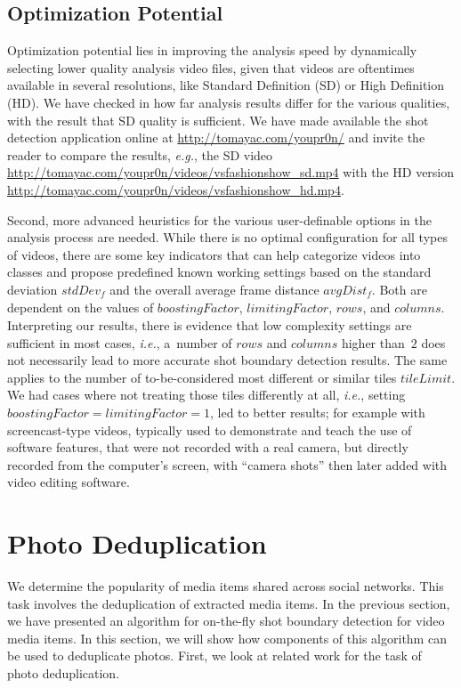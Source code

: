 \subsection{Optimization Potential}

Optimization potential lies in
improving the analysis speed by dynamically selecting
lower quality analysis video files,
given that videos are oftentimes available in several resolutions,
like Standard Definition (SD) or High Definition (HD).
We have checked in how far analysis results differ
for the various qualities,
with the result that SD quality is sufficient.
We have made available the shot detection application online at
\url{http://tomayac.com/youpr0n/} and invite the reader to compare
the results, \emph{e.g.}, the SD video
\url{http://tomayac.com/youpr0n/videos/vsfashionshow_sd.mp4} with
the HD version \url{http://tomayac.com/youpr0n/videos/vsfashionshow_hd.mp4}.

Second, more advanced heuristics for the various user-definable
options in the analysis process are needed.
While there is no optimal configuration for all types of videos,
there are some key indicators that can help categorize videos
into classes and propose predefined known working settings
based on the standard deviation $\mathit{stdDev_{f}}$
and the overall average frame distance $\mathit{avgDist_{f}}$.
Both are dependent on the values of $\mathit{boostingFactor}$,
$\mathit{limitingFactor}$, $\mathit{rows}$, and $\mathit{columns}$. 
Interpreting our results, there is evidence
that low complexity settings are sufficient in most cases,
\emph{i.e.}, a~number of $\mathit{rows}$ and $\mathit{columns}$
higher than~$\mathit{2}$ does not necessarily
lead to more accurate shot boundary detection results.
The same applies to the number of to-be-considered most different
or similar tiles $\mathit{tileLimit}$.
We had cases where not treating those tiles differently
at all, \emph{i.e.}, setting
$\mathit{boostingFactor} = \mathit{limitingFactor} = \mathit{1}$, 
led to better results; for example with screencast-type videos,
typically used to demonstrate and teach the use of software features,
that were not recorded with a real camera,
but directly recorded from the computer's screen, with ``camera shots''
then later added with video editing software.

\section{Photo Deduplication}

We determine the popularity of media items
shared across social networks.
This task involves the deduplication of extracted media items.
In the previous section, we have presented an algorithm
for on-the-fly shot boundary detection for video media items.
In this section, we will show how components of this algorithm
can be used to deduplicate photos.
First, we look at related work for the task of photo deduplication.

